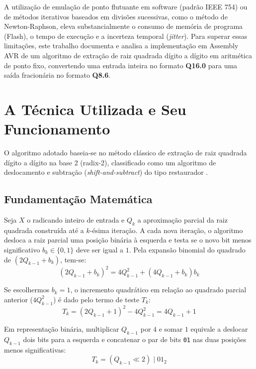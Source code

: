 \documentclass[conference]{IEEEtran}
\begin{document}
A utilização de emulação de ponto flutuante em software (padrão IEEE 754) ou de métodos iterativos baseados em divisões sucessivas, como o método de Newton-Raphson, eleva substancialmente o consumo de memória de programa (Flash), o tempo de execução e a incerteza temporal (\textit{jitter}). Para superar essas limitações, este trabalho documenta e analisa a implementação em Assembly AVR de um algoritmo de extração de raiz quadrada dígito a dígito em aritmética de ponto fixo, convertendo uma entrada inteira no formato \textbf{Q16.0} para uma saída fracionária no formato \textbf{Q8.6}.

\section{A Técnica Utilizada e Seu Funcionamento}
O algoritmo adotado baseia-se no método clássico de extração de raiz quadrada dígito a dígito na base 2 (radix-2), classificado como um algoritmo de deslocamento e subtração (\textit{shift-and-subtract}) do tipo restaurador \cite{ref2}.

\subsection{Fundamentação Matemática}
Seja $X$ o radicando inteiro de entrada e $Q_k$ a aproximação parcial da raiz quadrada construída até a $k$-ésima iteração. A cada nova iteração, o algoritmo desloca a raiz parcial uma posição binária à esquerda e testa se o novo bit menos significativo $b_k \in \{0, 1\}$ deve ser igual a $1$. Pela expansão binomial do quadrado de $(2Q_{k-1} + b_k)$, tem-se:
\begin{equation}
	(2Q_{k-1} + b_k)^2 = 4Q_{k-1}^2 + (4Q_{k-1} + b_k)b_k
	\label{eq:binomial}
\end{equation}

Se escolhermos $b_k = 1$, o incremento quadrático em relação ao quadrado parcial anterior ($4Q_{k-1}^2$) é dado pelo termo de teste $T_k$:
\begin{equation}
	T_k = (2Q_{k-1} + 1)^2 - 4Q_{k-1}^2 = 4Q_{k-1} + 1
	\label{eq:termo_teste}
\end{equation}

Em representação binária, multiplicar $Q_{k-1}$ por $4$ e somar $1$ equivale a deslocar $Q_{k-1}$ dois bits para a esquerda e concatenar o par de bits \texttt{01} nas duas posições menos significativas:
\begin{equation}
	T_k = (Q_{k-1} \ll 2) \mid 01_2
	\label{eq:concatenacao}
\end{equation}
\end{document}
